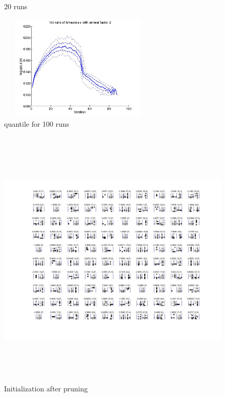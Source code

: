 \documentclass{article}
\begin{document}
\begin{spacing}{1.1}
\begin{figure}[h]
\begin{minipage}[b]{0.5\textwidth}
    \caption{20 runs}
    \label{fig:by:table} 
  \end{minipage}%
  \begin{minipage}[b]{0.5\textwidth} 
    \centering 
    \includegraphics[width=3in,height=2in]{100_kmeans_2_q.jpg} 
    \caption{quantile for 100 runs}
    \label{fig:by:table}  
   \end{minipage}%
\end{figure}
\begin{figure}
    \centering 
    \includegraphics[width=7in,height=5in]{100_kmeans_prune.jpg} 
    \caption{Initialization after pruning}
\end{figure}


\end{spacing}
\end{document}
